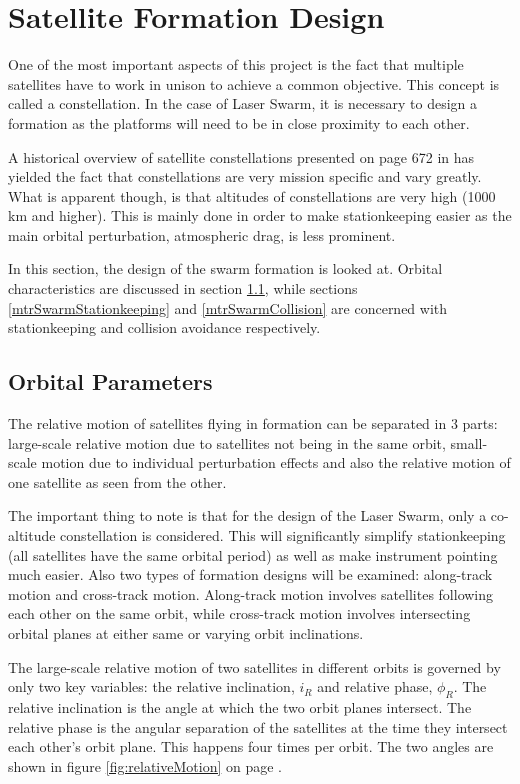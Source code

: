 \section{Satellite Formation Design}
\label{mtrSwarmDesign}
One of the most important aspects of this project is the fact that multiple satellites have to work in unison to achieve a common objective. This concept is called a constellation. In the case of Laser Swarm, it is necessary to design a formation as the platforms will need to be in close proximity to each other. 

A historical overview of satellite constellations presented on page 672 in \cite{constDesign} has yielded the fact that constellations are very mission specific and vary greatly. What is apparent though, is that altitudes of constellations are very high (1000 km and higher). This is mainly done in order to make stationkeeping easier as the main orbital perturbation, atmospheric drag, is less prominent.

In this section, the design of the swarm formation is looked at. Orbital characteristics are discussed in section \ref{mtrSwarmOrbitalParams}, while sections \ref{mtrSwarmStationkeeping} and \ref{mtrSwarmCollision} are concerned with stationkeeping and collision avoidance respectively. 
\subsection{Orbital Parameters}
\label{mtrSwarmOrbitalParams}

The relative motion of satellites flying in formation can be separated in 3 parts: large-scale relative motion due to satellites not being in the same orbit, small-scale motion due to individual perturbation effects and also the relative motion of one satellite as seen from the other.

The important thing to note is that for the design of the Laser Swarm, only a co-altitude constellation is considered. This will significantly simplify stationkeeping (all satellites have the same orbital period) as well as make instrument pointing much easier. Also two types of formation designs will be examined: along-track motion and cross-track motion. Along-track motion involves satellites following each other on the same orbit, while cross-track motion involves intersecting orbital planes at either same or varying orbit inclinations. 

The large-scale relative motion of two satellites in different orbits is governed by only two key variables: the relative inclination, $i_R$ and relative phase, $\phi_R$. The relative inclination is the angle at which the two orbit planes intersect. The relative phase is the angular separation of the satellites at the time they intersect each other's orbit plane. This happens four times per orbit. The two angles are shown in figure \ref{fig:relativeMotion} on page \pageref{fig:relativeMotion}.

